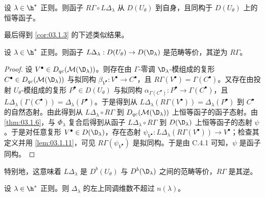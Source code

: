 \begin{lemma}\label{lem:03.1.11}
设 $\lambda\in\h^*$ 正则。则函子 $R\Gamma\circ L\Delta_\lambda$ 从 $D(U_\theta)$ 到自身，且同构于 $D(U_\theta)$ 上的恒等函子。
\end{lemma}

最后得到 \ref{cor:03.1.3} 的下述类似结果。

\begin{theorem}\label{thm:03.1.12}
设 $\lambda\in\h^*$ 正则。则函子 $L\Delta_\lambda:D(U_\theta)\to D(\D_\lambda)$ 是范畴等价，其逆为 $R\Gamma$。
\end{theorem}

\begin{proof}
设 $V^\bullet\in D_{qc}(\mathcal{M}(\D_\lambda))$。则存在由 $\Gamma$-零调 $\D_\lambda$-模组成的复形 $C^\bullet\in D_{qc}(\mathcal{M}(\D_\lambda))$ 与拟同构 $\beta_{V^\bullet}:V^\bullet\to C^\bullet$，且 $R\Gamma(V^\bullet)=\Gamma(C^\bullet)$。又存在由投射 $U_\theta$-模组成的复形 $P^\bullet\in D(U_\theta)$ 与拟同构 $\alpha_{\Gamma(C^\bullet)}:P^\bullet\to\Gamma(C^\bullet)$，且 $L\Delta_\lambda(\Gamma(C^\bullet))=\Delta_\lambda(P^\bullet)$。于是得到从 $L\Delta_\lambda(R\Gamma(V^\bullet))=\Delta_\lambda(P^\bullet)$ 到 $C^\bullet$ 的自然态射。由此得到从 $L\Delta_\lambda\circ R\Gamma$ 到 $D_{qc}(\mathcal{M}(\D_\lambda))$ 上恒等函子的函子态射。由 \ref{thm:03.1.6}，与 $\Phi_\lambda$ 复合后得到从函子 $L\Delta_\lambda\circ R\Gamma$ 到 $D(\D_\lambda)$ 上恒等函子的态射 $\psi$。于是对任意复形 $V^\bullet\in D(\D_\lambda)$，存在态射 $\psi_{V^\bullet}:L\Delta_\lambda(R\Gamma(V^\bullet))\to V^\bullet$；检查其定义并用 \ref{lem:03.1.11}，可见 $R\Gamma(\psi_{V^\bullet})$ 是拟同构。于是由 C.4.1 可知，$\psi$ 是函子同构。
\end{proof}

特别地，这意味着 $L\Delta_\lambda$ 是 $D^b(U_\theta)$ 与 $D^b(\D_\lambda)$ 之间的范畴等价，$R\Gamma$ 是其逆。

\begin{theorem}\label{thm:03.1.13}
设 $\lambda\in\h^*$ 正则。则 $\Delta_\lambda$ 的左上同调维数不超过 $n(\lambda)$。
\end{theorem}

